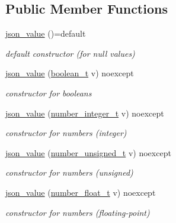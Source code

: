 \subsection*{Public Member Functions}
\begin{DoxyCompactItemize}
\item 
\hyperlink{unionnlohmann_1_1basic__json_1_1json__value_a3507013b18c19fcf945618fe97a69f0f}{json\+\_\+value} ()=default
\begin{DoxyCompactList}\small\item\em default constructor (for null values) \end{DoxyCompactList}\item 
\hyperlink{unionnlohmann_1_1basic__json_1_1json__value_a2538617eb31ab405a3d4dd7b4a824654}{json\+\_\+value} (\hyperlink{classnlohmann_1_1basic__json_a4c919102a9b4fe0d588af64801436082}{boolean\+\_\+t} v) noexcept
\begin{DoxyCompactList}\small\item\em constructor for booleans \end{DoxyCompactList}\item 
\hyperlink{unionnlohmann_1_1basic__json_1_1json__value_a590de5a8704d5e3f0dba1cc47b8314a5}{json\+\_\+value} (\hyperlink{classnlohmann_1_1basic__json_a98e611d67b7bd75307de99c9358ab2dc}{number\+\_\+integer\+\_\+t} v) noexcept
\begin{DoxyCompactList}\small\item\em constructor for numbers (integer) \end{DoxyCompactList}\item 
\hyperlink{unionnlohmann_1_1basic__json_1_1json__value_a0bac352145b02ec3dd280bbfef997a55}{json\+\_\+value} (\hyperlink{classnlohmann_1_1basic__json_ab906e29b5d83ac162e823ada2156b989}{number\+\_\+unsigned\+\_\+t} v) noexcept
\begin{DoxyCompactList}\small\item\em constructor for numbers (unsigned) \end{DoxyCompactList}\item 
\hyperlink{unionnlohmann_1_1basic__json_1_1json__value_a39a41858abe635623710e1b0ce827593}{json\+\_\+value} (\hyperlink{classnlohmann_1_1basic__json_a88d6103cb3620410b35200ee8e313d97}{number\+\_\+float\+\_\+t} v) noexcept
\begin{DoxyCompactList}\small\item\em constructor for numbers (floating-\/point) \end{DoxyCompactList}\item 

\end{DoxyCompactItemize}
